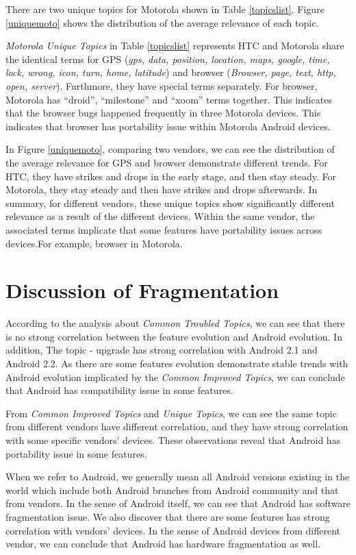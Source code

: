 \documentclass[10pt, conference, compsocconf]{IEEEtran}
\begin{document}
There are two unique topics for Motorola shown in Table \ref{topicslist}. Figure \ref{uniquemoto} shows the distribution of the average relevance of each topic.

\textit{Motorola Unique Topics} in Table \ref{topicslist} represents HTC and Motorola share the identical terms for GPS (\textit{gps, data, position, location, maps, google, time, lock, wrong, icon, turn, home, latitude}) and browser (\textit{Browser, page, text, http, open, server}). Furthmore, they have special terms separately. For browser, Motorola has “droid”, “milestone” and “xoom” terms together. This indicates that the browser bugs happened frequently in three Motorola devices. This indicates that browser has portability issue within Motorola Android devices.

In Figure \ref{uniquemoto}, comparing two vendors, we can see the distribution of the average relevance for GPS and browser demonstrate different trends. For HTC, they have strikes and drops in the early stage, and then stay steady. For Motorola, they stay steady and then have strikes and drops afterwards.
In summary, for different vendors, these unique topics show significantly different relevance as a result of the different devices. Within the same vendor, the associated terms implicate that some features have portability issues across devices.For example, browser in Motorola.

\section{Discussion of Fragmentation}
According to the analysis about \textit{Common Troubled Topics}, we can see that there is no strong correlation between the feature evolution and Android evolution. In addition, The topic - upgrade has strong correlation with Android 2.1 and Android 2.2. As there are some features evolution demonstrate stable trends with Android evolution implicated by the \textit{Common Improved Topics}, we can conclude that Android has compatibility issue in some features.

From \textit{Common Improved Topics} and \textit{Unique Topics}, we can see the same topic from different vendors have different correlation, and they have strong correlation with some specific vendors' devices. These observations reveal that Android has portability issue in some features.

When we refer to Android, we generally mean all Android versions existing in the world which include both Android branches from Android community and that from vendors. In the sense of Android itself, we can see that Android has software fragmentation issue. We also discover that there are some features has strong correlation with vendors' devices. In the sense of Android devices from different vendor, we can conclude that Android has hardware fragmentation as well.
\end{document}
